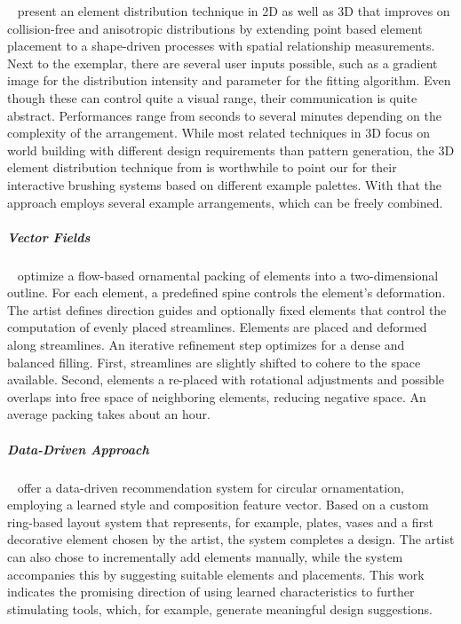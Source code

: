 \citeauthor*{landes_2013_asm}~\cite{landes_2013_asm} present an element distribution technique in 2D as well as 3D that improves on collision-free and anisotropic distributions by extending point based element placement to a shape-driven processes with spatial relationship measurements. Next to the exemplar, there are several user inputs possible, such as a gradient image for the distribution intensity and parameter for the fitting algorithm. Even though these can control quite a visual range, their communication is quite abstract. Performances range from seconds to several minutes depending on the complexity of the arrangement. While most related techniques in 3D focus on world building with different design requirements than pattern generation, the 3D element distribution technique from \cite{davison_2019_ief} is worthwhile to point our for their interactive brushing systems based on different example palettes. With that the approach employs several example arrangements, which can be freely combined. 



\subparagraph{Vector Fields}
\label{subpara:analysis_element_arrangements_fields}

\citeauthor*{saputra_2017_ffo}~\cite{saputra_2017_ffo} optimize a flow-based ornamental packing of elements into a two-dimensional outline. For each element, a predefined spine controls the element's deformation. The artist defines direction guides and optionally fixed elements that control the computation of evenly placed streamlines. Elements are placed and deformed along streamlines. An iterative refinement step optimizes for a dense and balanced filling. First, streamlines are slightly shifted to cohere to the space available. Second, elements a re-placed with rotational adjustments and possible overlaps into free space of neighboring elements, reducing negative space. An average packing takes about an hour.




\subparagraph{Data-Driven Approach}
\label{subpara:analysis_element_arrangements_datadriven}

\citeauthor*{phan_2016_ple}~\cite{phan_2016_ple} offer a data-driven recommendation system for circular ornamentation, employing a learned style and composition feature vector. Based on a custom ring-based layout system that represents, for example, plates, vases and a first decorative element chosen by the artist, the system completes a design. The artist can also chose to incrementally add elements manually, while the system accompanies this by suggesting suitable elements and placements. This work indicates the promising direction of using learned characteristics to further stimulating tools, which, for example, generate meaningful design suggestions.



